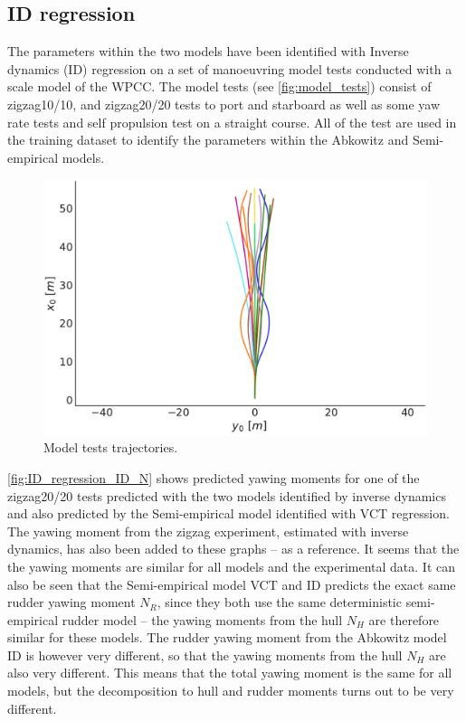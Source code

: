 \subsection{ID regression}
\label{sec:result_ID_regression}
The parameters within the two models have been identified with Inverse dynamics (ID) regression on a set of manoeuvring model tests conducted with a scale model of the WPCC. The model tests (see \autoref{fig:model_tests}) consist of zigzag10/10, and zigzag20/20 tests to port and starboard as well as some yaw rate tests and self propulsion test on a straight course. All of the test are used in the training dataset to identify the parameters within the Abkowitz and Semi-empirical models.
\begin{figure}[h!]
    \includegraphics[width=\textwidth]{figures/result_ID_regression.model_tests.pdf}
    \caption{Model tests trajectories.}
    \label{fig:model_tests}
\end{figure}
\autoref{fig:ID_regression_ID_N} shows predicted yawing moments for one of the zigzag20/20 tests predicted with the two models identified by inverse dynamics and also predicted by the Semi-empirical model identified with VCT regression. The yawing moment from the zigzag experiment, estimated with inverse dynamics, has also been added to these graphs -- as a reference. It seems that the the yawing moments are similar for all models and the experimental data. It can also be seen that the Semi-empirical model VCT and ID predicts the exact same rudder yawing moment $N_R$, since they both use the same deterministic semi-empirical rudder model -- the yawing moments from the hull $N_H$ are therefore similar for these models. The rudder yawing moment from the Abkowitz model ID is however very different, so that the yawing moments from the hull $N_H$ are also very different. This means that the total yawing moment is the same for all models, but the decomposition to hull and rudder moments turns out to be very different.
